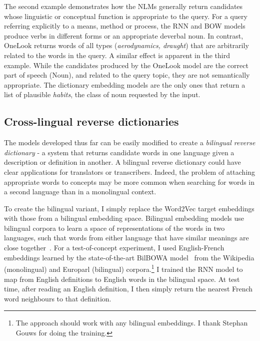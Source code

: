 The second example demonstrates how the NLMs generally return candidates whose linguistic or conceptual function is appropriate to the query. For a query referring explicitly to a means, method or process, the RNN and BOW models produce verbs in different forms or an appropriate deverbal noun. In contrast, OneLook returns words of all types (\emph{aerodynamics, draught}) that are arbitrarily related to the words in the query. A similar effect  is apparent in the third example. While the candidates produced by the OneLook model are the correct part of speech (Noun), and related to the query topic, they are not semantically appropriate. The dictionary embedding models are the only ones that return a list of plausible \emph{habits}, the class of noun requested by the input.  

  
\subsection{Cross-lingual reverse dictionaries}

The models developed thus far can be easily modified to create a \emph{bilingual reverse dictionary} - a system that returns candidate words in one language given a description or definition in another. A bilingual reverse dictionary could have clear applications for translators or transcribers. Indeed, the problem of attaching appropriate words to concepts may be more common when searching for words in a  second language than in a monolingual context.  

To create the bilingual variant, I simply replace the Word2Vec target embeddings with those from a bilingual embedding space. Bilingual embedding models use bilingual corpora to learn a space of representations of the words in two languages, such that words from either language that have similar meanings are close together~\citep{hermann2013multilingual,lauly2014autoencoder,gouws2014bilbowa}. For a test-of-concept experiment, I used English-French embeddings learned by the state-of-the-art BilBOWA model~\citep{gouws2014bilbowa} from the Wikipedia (monolingual) and Europarl (bilingual) corpora.\footnote{The approach should work with any bilingual embeddings. I thank Stephan Gouws for doing the training.} I trained the RNN model to map from English definitions to English words in the bilingual space. At test time, after reading an English definition, I then simply return the nearest French word neighbours to that definition.  


